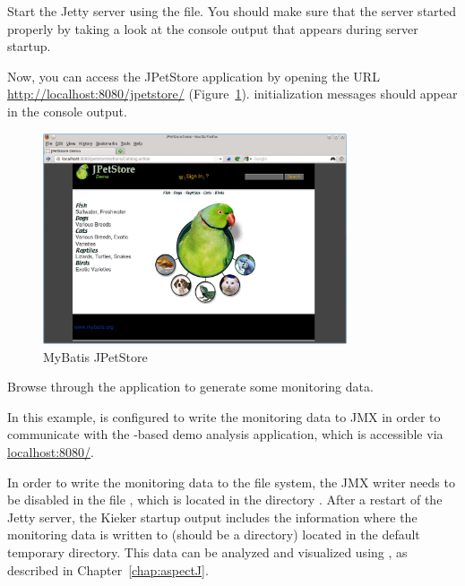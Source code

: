 \begin{compactenum}
\item Start the Jetty server using the  file. You should make %
   sure that the server started properly by taking a look at %
   the console output that appears during server startup.  
\item Now, you can access the JPetStore application by opening the URL
   \url{http://localhost:8080/jpetstore/} (Figure~\ref{fig:jpetstore}). %
   \Kieker{} initialization messages should appear in the console output. %
   
\begin{figure}[h]\centering
\includegraphics[width=0.8\textwidth]{images/jpetstore-example-FFscrsh}
\caption{MyBatis JPetStore}\label{fig:jpetstore}%
\end{figure}
   
\item   Browse through the application to generate some monitoring data. %
\item In this example, \Kieker{} is configured to write the monitoring data %
      to JMX in order to communicate with the \Kieker-based demo analysis %
      application, which is accessible via \url{localhost:8080/}.
   
\item In order to write the monitoring data to the file system, the %
      JMX writer needs to be disabled in the file , %
      which is located in the directory .
      After a restart of the Jetty server, the Kieker startup output includes the %
      information where the monitoring data is written to (should be a %
       directory) located in the default temporary %
      directory. %
   This data can be analyzed and visualized using \KiekerTraceAnalysis{}, %
   as described in Chapter~\ref{chap:aspectJ}.
\end{compactenum}

\medskip

 
